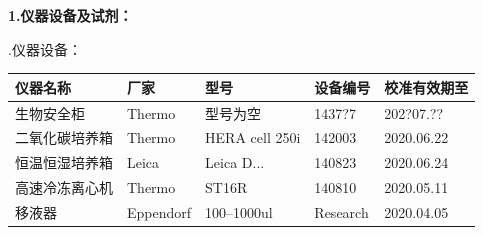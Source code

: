 \documentclass[UTF8,10pt,a4paper,fontset=fandol]{ctexart}
\newcommand{\fieldvalue}[1]{#1}
\newcommand{\handwritten}[1]{#1}
\begin{document}
\medskip

\noindent
\textbf{1.\quad 仪器设备及试剂：}

\medskip
{}.\quad 仪器设备：

\begin{center}
\small
\begin{tabular}{|p{2.5cm}|p{1.7cm}|p{2.3cm}|p{2.3cm}|p{2.2cm}|}
\hline
仪器名称 & 厂家 & 型号 & 设备编号 & 校准有效期至 \\ \hline
生物安全柜 &
\fieldvalue{Thermo} &
型号为空 &
\fieldvalue{\handwritten{1437?7}} &
\fieldvalue{\handwritten{202?07.??}}
\\ \hline
二氧化碳培养箱 &
\fieldvalue{Thermo} &
\fieldvalue{HERA cell 250i} &
\fieldvalue{\handwritten{142003}} &
\fieldvalue{\handwritten{2020.06.22}}
\\ \hline
恒温恒湿培养箱 &
\fieldvalue{Leica} &
\fieldvalue{Leica D...} &
\fieldvalue{\handwritten{140823}} &
\fieldvalue{\handwritten{2020.06.24}}
\\ \hline
高速冷冻离心机 &
\fieldvalue{Thermo} &
\fieldvalue{ST16R} &
\fieldvalue{\handwritten{140810}} &
\fieldvalue{\handwritten{2020.05.11}}
\\ \hline
移液器 &
\fieldvalue{Eppendorf} &
\fieldvalue{\handwritten{100--1000ul}} &
\fieldvalue{\handwritten{Research}} &
\fieldvalue{\handwritten{2020.04.05}}
\\ \hline
\end{tabular}
\end{center}
\end{document}
